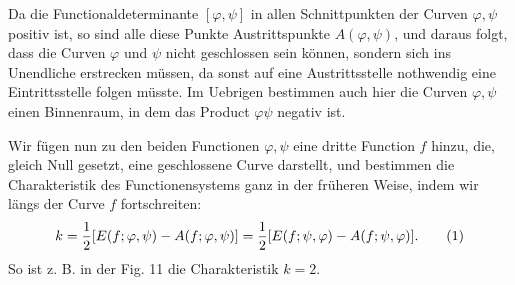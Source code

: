 \documentclass[11pt]{article}
\begin{document}
Da die Functionaldeterminante $[\varphi,\psi]$ in allen Schnittpunkten der Curven $\varphi,\psi$ positiv ist, so sind alle diese Punkte Austrittspunkte $A(\varphi,\psi)$, und daraus folgt, dass die Curven $\varphi$ und $\psi$ nicht geschlossen sein können, sondern sich ins Unendliche erstrecken müssen, da sonst auf eine Austrittsstelle nothwendig eine Eintrittsstelle folgen müsste. Im Uebrigen bestimmen auch hier die Curven $\varphi,\psi$ einen Binnenraum, in dem das Product $\varphi\psi$ negativ ist.

Wir fügen nun zu den beiden Functionen $\varphi,\psi$ eine dritte Function $f$ hinzu, die, gleich Null gesetzt, eine geschlossene Curve darstellt, und bestimmen die Charakteristik des Functionensystems ganz in der früheren Weise, indem wir längs der Curve $f$ fortschreiten:
\begin{equation}
 k={1\over2}[E(f;\varphi,\psi)-A(f;\varphi,\psi)]
  ={1\over2}[E(f;\psi,\varphi)-A(f;\psi,\varphi)].
\tag{1}
\end{equation}
So ist z. B. in der Fig. 11 die Charakteristik $k=2$.
\end{document}
